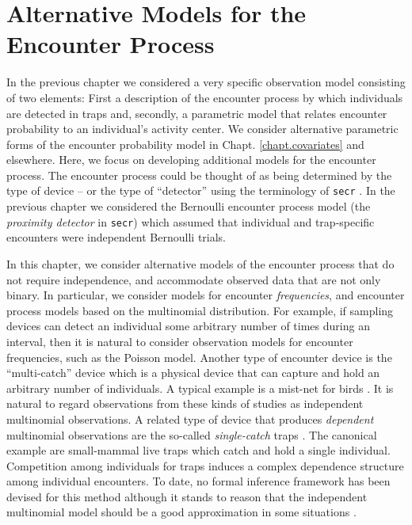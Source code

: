 \chapter{Alternative Models for the Encounter Process}
\label{chapt.poisson-mn}

\vspace{.3in}



In the previous chapter we considered a very specific
 observation model consisting of
two elements: First a description of the encounter process by
which individuals are detected in traps and, secondly, a parametric
model that relates encounter probability to an individual's activity
center.  We consider alternative parametric forms of the encounter
probability model in Chapt. \ref{chapt.covariates} and elsewhere.
Here, we focus on developing additional models for the encounter
process.  The encounter process could be thought of as being
determined by the type of device -- or the type of ``detector'' using
the terminology of \mbox{\tt secr} \citep{efford:2011}.  In the
previous chapter we considered the Bernoulli encounter process model
(the {\it proximity detector} in \mbox{\tt secr}) which assumed that
individual and trap-specific encounters were independent Bernoulli
trials.

In this chapter, we consider alternative models of the encounter
process that do not require independence, and accommodate observed
data that are not only binary.  In particular, we consider models for
encounter {\it frequencies}, and encounter process models based on the
multinomial distribution. For example, if sampling devices can detect
an individual some arbitrary number of times during an interval, then
it is natural to consider observation models for encounter
frequencies, such as the Poisson model. Another type of encounter
device is the ``multi-catch'' device \citep{efford_etal:2009euring}
which is a physical device that can capture and hold an arbitrary
number of individuals. A typical example is a mist-net for birds
\citep{borchers_efford:2008}.  It is natural to regard observations
from these kinds of studies as independent multinomial observations.
A related type of device that produces {\it dependent} multinomial
observations are the so-called {\it single-catch} traps
\citep{efford:2004, efford_etal:2009euring}. The canonical example are
small-mammal live traps \citep{converse_etal:2006ea} which catch and
hold a single individual. Competition among individuals for traps
induces a complex dependence structure among individual encounters. To
date, no formal inference framework has been devised for this method
although it stands to reason that the independent multinomial model
should be a good approximation in some situations
\citep{efford_etal:2009euring}.

